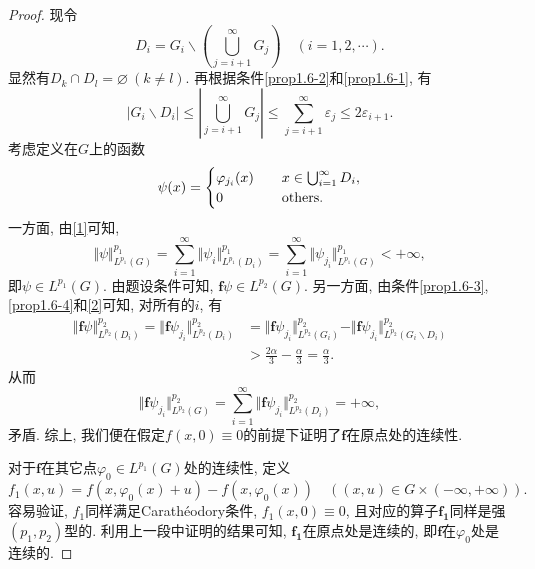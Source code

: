 \begin{proposition}
\begin{proof}
        现令 
        \begin{equation*}
            D_i = G_i \smallsetminus \left(\bigcup_{j = i + 1}^{\infty}G_j\right) \quad (i = 1, 2, \cdots).
        \end{equation*}
        显然有$D_k \cap D_l = \varnothing\ (k \neq l)$. 再根据条件\ref{prop1.6-2}和\ref{prop1.6-1}, 有 
        \begin{equation}\label{2}
            |G_i \smallsetminus D_i| \leq \left|\bigcup_{j = i + 1}^{\infty}G_j\right| \leq \sum_{j = i + 1}^{\infty}\varepsilon_j \leq 2\varepsilon_{i + 1}.
        \end{equation}
        考虑定义在$G$上的函数 
        \begin{equation*}
            \psi(x) = 
            \begin{cases}
                \varphi_{j_i}(x) \quad &x \in \bigcup_{i = 1}^{\infty}D_i, \\ 
                0 \quad &{\rm others}.
            \end{cases}
        \end{equation*}
        一方面, 由\eqref{1}可知, 
        \begin{equation*}
            \Vert \psi\Vert_{L^{p_1}(G)}^{p_1} = \sum_{i = 1}^{\infty}\Vert \psi_i\Vert_{L^{p_1}(D_i)}^{p_1} = \sum_{i = 1}^{\infty}\Vert \psi_{j_i}\Vert_{L^{p_1}(G)}^{p_1} < +\infty,
        \end{equation*}
        即$\psi \in L^{p_1}(G)$. 由题设条件可知, $\bm{f}\psi \in L^{p_2}(G)$. 另一方面, 由条件\ref{prop1.6-3}, \ref{prop1.6-4}和\eqref{2}可知, 对所有的$i$, 有
        \begin{align*}
            \Vert \bm{f}\psi\Vert_{L^{p_2}(D_i)}^{p_2} = \Vert \bm{f}\psi_{j_i}\Vert_{L^{p_2}(D_i)}^{p_2} &= \Vert \bm{f}\psi_{j_i}\Vert_{L^{p_2}(G_i)}^{p_2} - \Vert \bm{f}\psi_{j_i}\Vert_{L^{p_2}(G_i \smallsetminus D_i)}^{p_2} \\
            &> \frac{2\alpha}{3} - \frac{\alpha}{3} = \frac{\alpha}{3}. 
        \end{align*}
        从而 
        \begin{equation*}
            \Vert \bm{f}\psi_{j_i}\Vert_{L^{p_2}(G)}^{p_2} = \sum_{i = 1}^{\infty}\Vert \bm{f}\psi_{j_i}\Vert_{L^{p_2}(D_i)}^{p_2} = +\infty,
        \end{equation*}
        矛盾. 综上, 我们便在假定$f(x, 0) \equiv 0$的前提下证明了$\bm{f}$在原点处的连续性.

        对于$\bm{f}$在其它点$\varphi_0 \in L^{p_1}(G)$处的连续性, 定义 
        \begin{equation*}
            f_1(x, u) = f(x, \varphi_0(x) + u) - f(x, \varphi_0(x)) \quad ((x, u) \in G \times (-\infty, +\infty)).
        \end{equation*}
        容易验证, $f_1$同样满足Carath\'eodory条件, $f_1(x, 0) \equiv 0$, 且对应的算子$\bm{f_1}$同样是强$(p_1, p_2)$型的. 利用上一段中证明的结果可知, $\bm{f_1}$在原点处是连续的, 即$\bm{f}$在$\varphi_0$处是连续的.


\end{proof}
\end{proposition}
